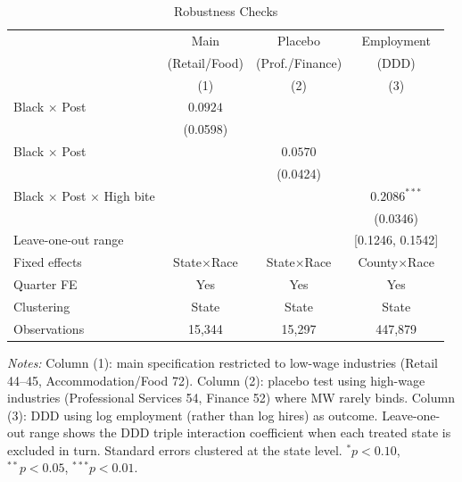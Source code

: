 \begin{table}[htbp]
\centering
\caption{Robustness Checks}
\label{tab:robustness}
\begin{tabular}{lccc}
\hline\hline
 & Main & Placebo & Employment \\
 & (Retail/Food) & (Prof./Finance) & (DDD) \\
 & (1) & (2) & (3) \\
\hline
Black $\times$ Post & $0.0924$ & & \\
 & (0.0598) & & \\
Black $\times$ Post & & $0.0570$ & \\
 & & (0.0424) & \\
Black $\times$ Post $\times$ High bite & & & $0.2086^{***}$ \\
 & & & (0.0346) \\
\hline
Leave-one-out range & & & [0.1246, 0.1542] \\
Fixed effects & State$\times$Race & State$\times$Race & County$\times$Race \\
Quarter FE & Yes & Yes & Yes \\
Clustering & State & State & State \\
Observations & 15,344 & 15,297 & 447,879 \\
\hline\hline
\end{tabular}
\begin{tablenotes}[flushleft]\small
\item \textit{Notes:} Column (1): main specification restricted to low-wage industries (Retail 44--45, Accommodation/Food 72). Column (2): placebo test using high-wage industries (Professional Services 54, Finance 52) where MW rarely binds. Column (3): DDD using log employment (rather than log hires) as outcome. Leave-one-out range shows the DDD triple interaction coefficient when each treated state is excluded in turn. Standard errors clustered at the state level. $^{*}p<0.10$, $^{**}p<0.05$, $^{***}p<0.01$.
\end{tablenotes}
\end{table}

